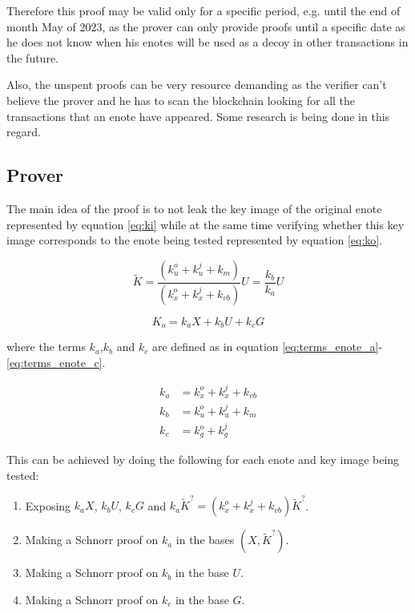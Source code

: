 \documentclass[usletter,11pt,english,oneside,onecolumn,final,openany]{report}
\begin{document}
Therefore this proof may be valid only for a specific period, e.g. until the end of month May of 2023, as the prover can only provide proofs until a specific date as he does not know when his enotes will be used as a decoy in other transactions in the future.

Also, the unspent proofs can be very resource demanding as the verifier can't believe the prover and he has to scan the blockchain looking for all the transactions that an enote have appeared. Some research is being done in this regard.

\subsection{Prover}

The main idea of the proof is to not leak the key image of the original enote represented by equation \ref{eq:ki} while at the same time verifying whether this key image corresponds to the enote being tested represented by equation \ref{eq:ko}.

\begin{equation}
    \tilde{K}  = \frac{(k^o_u + k^j_u + k_m)}{(k^o_x + k^j_x + k_{vb})} U = \frac{k_b}{k_a}U
\label{eq:ki}
\end{equation}

\begin{equation}
    K_o = k_a X + k_b U + k_c G
\label{eq:ko}
\end{equation}

where the terms $k_a$,$k_b$ and $k_c$ are defined as in equation \ref{eq:terms_enote_a}-\ref{eq:terms_enote_c}.

\begin{align}
    \label{eq:terms_enote_a}
    k_a &= k^o_x + k^j_x + k_{vb} \\
    \label{eq:terms_enote_b}
    k_b &= k^o_u + k^j_u + k_{m} \\
    \label{eq:terms_enote_c}
    k_c &= k^o_g + k^j_g
\end{align}

This can be achieved by doing the following for each enote and key image being tested:
\begin{enumerate}
\item Exposing $k_a X$, $k_b U$, $k_c G$ and $k_a \tilde{K}^?  = (k^o_x + k^j_x + k_{vb}) \tilde{K}^? $.
\item Making a Schnorr proof on $k_a$ in the bases ${(X,\tilde{K}^?)}$.
\item Making a Schnorr proof on $k_b$ in the base $U$.
\item Making a Schnorr proof on $k_c$ in the base $G$.
\end{enumerate}
\end{document}
